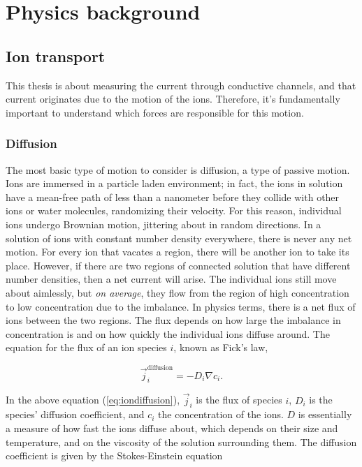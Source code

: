 	\section{Physics background}
	
	
		\subsection{Ion transport}
			This thesis is about measuring the current through conductive channels, and that current originates due to the motion of the ions. Therefore, it's fundamentally important to understand which forces are responsible for this motion.
			
			\subsubsection{Diffusion}
				The most basic type of motion to consider is diffusion, a type of passive motion. Ions are immersed in a particle laden environment; in fact, the ions in solution have a mean-free path of less than a nanometer before they collide with other ions or water molecules, randomizing their velocity. For this reason, individual ions undergo Brownian motion, jittering about in random directions. In a solution of ions with constant number density everywhere, there is never any net motion. For every ion that vacates a region, there will be another ion to take its place. However, if there are two regions of connected solution that have different number densities, then a net current will arise. The individual ions still move about aimlessly, but \textit{on average}, they flow from the region of high concentration to low concentration due to the imbalance. In physics terms, there is a net flux of ions between the two regions. The flux depends on how large the imbalance in concentration is and on how quickly the individual ions diffuse around. The equation for the flux of an ion species $i$, known as Fick's law,
				
				\begin{equation} \label{eq:iondiffusion} \tag{Fick's first law}
					\vec{j}^{\mathrm{diffusion}}_{i}=-D_{i}\nabla c_{i}.
				\end{equation}

				In the above equation (\ref{eq:iondiffusion}), $\vec{j}_{i}$ is the flux of species $i$, $D_{i}$ is the species' diffusion coefficient, and $c_{i}$ the concentration of the ions. $D$ is essentially a measure of how fast the ions diffuse about, which depends on their size and temperature, and on the viscosity of the solution surrounding them. The diffusion coefficient is given by the Stokes-Einstein equation
				
